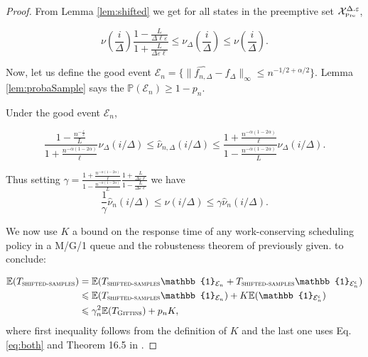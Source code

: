 \documentclass[11pt]{article}
\renewcommand{\epsilon}{\varepsilon}
\renewcommand{\geq}{\geqslant}
\renewcommand{\leq}{\leqslant}
\newcommand{\E}{\mathbb{E}}
\newcommand{\pr}{\mathbb{P}}
\newcommand{\one}{\mathbb{1}}
\newcommand{\XP}{\mathcal{X}_{\mbox{\tiny Pre}}}
\begin{document}
\begin{proof}
    From Lemma \ref{lem:shifted} we get for all states in the preemptive set $\XP^{\Delta.\epsilon}$,

    $$\nu(\frac{i}{\Delta}) \frac{1 - \frac{L}{\Delta \ell \epsilon}}{1 + \frac{L}{\Delta
        \epsilon \ell}}\leq \nu_\Delta(\frac{i}{\Delta}) \leq \nu(\frac{i}{\Delta}).$$

    Now, let us  define the good event $\mathcal{E}_n = \{ \lVert \widehat{f_{n, \Delta}} - f_\Delta \rVert_\infty\leq n^{-1/2 +\alpha/2} \}$. Lemma \ref{lem:probaSample} says the $\pr(\mathcal{E}_n ) \geq 1-p_n$.

    Under the good event $\mathcal{E}_n$, 

    $$\frac{1 -
    \frac{n^{-\frac{\epsilon}{2}}}{L}}{1+\frac{n^{-\alpha (1-2\alpha)}}{\ell}}
    \nu_\Delta(i/\Delta)
    \leq \hat{\nu}_{n, \Delta}(i/\Delta) \leq \frac{1 + \frac{n^{-\alpha (1-2\alpha)}}{\ell}}{1 -
    \frac{n^{-\alpha (1-2\alpha)}}{L}} \nu_\Delta(i/\Delta).$$

    Thus setting  $\gamma = \frac{1 + \frac{n^{-\alpha (1-2\alpha)}}{\ell}}{1 -
            \frac{n^{-\alpha (1-2\alpha)}}{L}} \frac{1 + \frac{L}{\Delta  \epsilon
              \ell}}{1 - \frac{L}{\Delta  \epsilon \ell}}$  we have
          \begin{equation} \label{eq:both}
            \frac{1}{\gamma} \hat{\nu}_{n} (i/\Delta) \leq \nu(i/\Delta)
    \leq \gamma \hat{\nu}_n(i/\Delta). 
  \end{equation}
 
    

    We now use $K$ a bound on the response time of any work-conserving scheduling policy in a M/G/1 queue and the robusteness theorem of \cite{ScullyPhD} previously given.  to conclude:

    \begin{align*}
      \E(T_{\textsc{shifted-samples}}) &=  \E(T_{\textsc{shifted-samples}} \one_{\mathcal{E}_n} + T_{\textsc{shifted-samples}}
                                        \one_{\mathcal{E}_n^{\mathsf{c}}})\\
      & \leq \E(T_{\textsc{shifted-samples}} \one_{\mathcal{E}_n} ) +  K \E( \one_{\mathcal{E}_n^{\mathsf{c}}}) \\
                                      & \leq  \gamma_n^2 \E(T_{\textsc{Gittins}}) + p_n K,
    \end{align*}
    where first inequality follows from the definition of $K$ and the last one uses Eq. \eqref{eq:both} and Theorem 16.5 in \cite{ScullyPhD}.
      

\end{proof}
\end{document}
